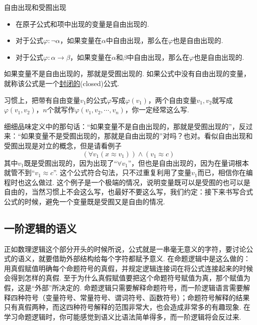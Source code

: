 \documentclass[main.tex]{subfiles}
\begin{document}
\begin{definition}{自由出现和受囿出现}
    \begin{itemize}
        \item 在原子公式和项中出现的变量是自由出现的.
        \item 对于公式\(\varphi: \neg \alpha\)，如果变量在\(\alpha\)中自由出现，那么在\(\varphi\)也是自由出现的.
        \item 对于公式\(\varphi: \alpha \to \beta\)，如果变量在\(\alpha\)和\(\beta\)中自由出现，那么在\(\varphi\)也是自由出现的.
    \end{itemize}
    如果变量不是自由出现的，那就是受囿出现的. 如果公式中没有自由出现的变量，就称该公式是一个\uline{封闭的}(closed)公式.
\end{definition}

\begin{reference}
    习惯上，把带有自由变量\(v_1\)的公式\(\varphi\)写成\(\varphi(v_1)\)，两个自由变量\(v_1,v_2\)就写成\(\varphi(v_1,v_2)\)，\(n\)个就写作\(\varphi(v_1, v_2, \cdots, v_n)\)，你一定经常这么写. 
\end{reference}

细细品味定义中的那句话：“如果变量不是自由出现的，那就是受囿出现的”，反过来：“如果变量不是受囿出现的，那就是自由出现的”对吗？也对。看似自由出现和受囿出现是对立的概念，但是请看例子
\[(\forall v_1(x \approx v_1)) \wedge (v_1 \approx c)\]
其中\(v_1\)既是受囿出现的，因为出现了“\(\forall v_1\)”，但也是自由出现的，因为在量词根本就管不到“\(v_1 \approx c\)”. 这个公式符合句法，只不过重复利用了变量\(v_1\)而已，相信你在编程时也这么做过. 这个例子是一个极端的情况，说明变量既可以是受囿的也可以是自由的，当然习惯上不会这么写，也最好不要这么写，我们约定：接下来书写合式公式的时候，避免一个变量既是受囿又是自由的情况.


\subsection{一阶逻辑的语义}

正如数理逻辑这个部分开头的时候所说，公式就是一串毫无意义的字符，要讨论公式的语义，就要借助外部结构给每个字符都赋予意义. 在命题逻辑中是这么做的：用真假赋值明确每个命题符号的真假，并规定逻辑连接词在将公式连接起来的时候会得到怎样的真假. 至于为什么真假赋值要把这个命题符号赋值为真，那个赋值为假，这是“外部”所决定的. 命题逻辑只需要解释命题符号，而一阶逻辑语言需要解释四种符号（变量符号、常量符号、谓词符号、函数符号）；命题符号解释的结果只有真假两种，而这四种符号解释的范围非常大，也会造成非常多的有趣现象. 在学习命题逻辑时，你可能感觉到语义比语法简单得多，而一阶逻辑将会反过来.
\end{document}
